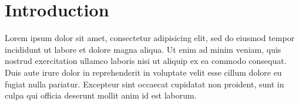 \chapter{Introduction}
\label{ch1-intr}

Lorem ipsum dolor sit amet, consectetur adipisicing elit, sed do eiusmod tempor
incididunt ut labore et dolore magna aliqua. Ut enim ad minim veniam, quis
nostrud exercitation ullamco laboris nisi ut aliquip ex ea commodo consequat.
Duis aute irure dolor in reprehenderit in voluptate velit esse cillum dolore eu
fugiat nulla pariatur. Excepteur sint occaecat cupidatat non proident, sunt in
culpa qui officia deserunt mollit anim id est laborum.




